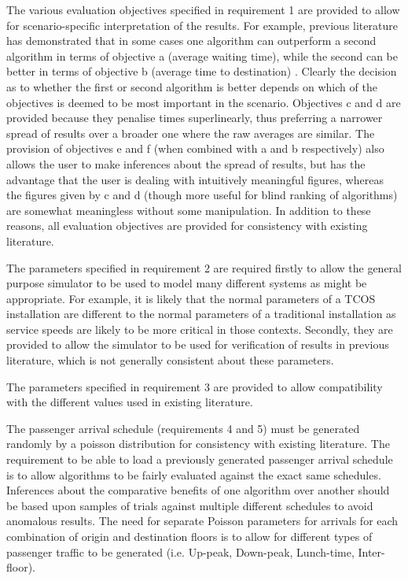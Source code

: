 \documentclass{UoYCSproject}
\begin{document}
The various evaluation objectives specified in requirement 1 are provided to allow for scenario-specific interpretation of the results.  For example, previous literature has demonstrated that in some cases one algorithm can outperform a second algorithm in terms of objective a (average waiting time), while the second can be better in terms of objective b (average time to destination) \citep{Bao1994}.  Clearly the decision as to whether the first or second algorithm is better depends on which of the objectives is deemed to be most important in the scenario.  Objectives c and d are provided because they penalise times superlinearly, thus preferring a narrower spread of results over a broader one where the raw averages are similar.  The provision of objectives e and f (when combined with a and b respectively) also allows the user to make inferences about the spread of results, but has the advantage that the user is dealing with intuitively meaningful figures, whereas the figures given by c and d (though more useful for blind ranking of algorithms) are somewhat meaningless without some manipulation.  In addition to these reasons, all evaluation objectives are provided for consistency with existing literature.

The parameters specified in requirement 2 are required firstly to allow the general purpose simulator to be used to model many different systems as might be appropriate.  For example, it is likely that the normal parameters of a TCOS installation are different to the normal parameters of a traditional installation as service speeds are likely to be more critical in those contexts.  Secondly, they are provided to allow the simulator to be used for verification of results in previous literature, which is not generally consistent about these parameters.

The parameters specified in requirement 3 are provided to allow compatibility with the different values used in existing literature.

The passenger arrival schedule (requirements 4 and 5) must be generated randomly by a poisson distribution for consistency with existing literature.  The requirement to be able to load a previously generated passenger arrival schedule is to allow algorithms to be fairly evaluated against the exact same schedules.  Inferences about the comparative benefits of one algorithm over another should be based upon samples of trials against multiple different schedules to avoid anomalous results.  The need for separate Poisson parameters for arrivals for each combination of origin and destination floors is to allow for different types of passenger traffic to be generated (i.e. Up-peak, Down-peak, Lunch-time, Inter-floor).
\end{document}
